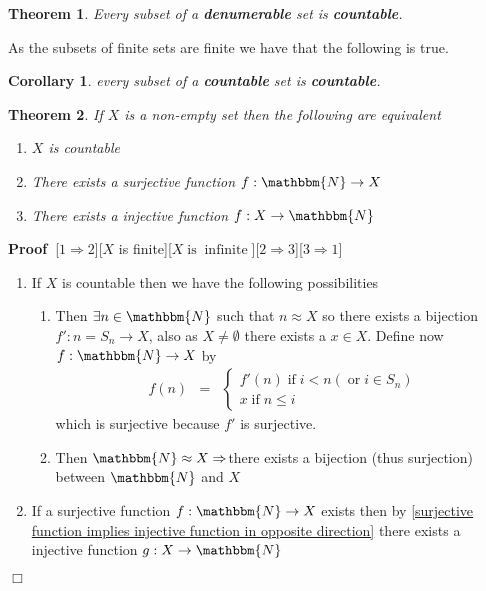 \documentclass{book}
\newcommand{\tmop}[1]{\ensuremath{\operatorname{#1}}}
\newcommand{\tmtextbf}[1]{{\bfseries{#1}}}
\newenvironment{proof}{\noindent\textbf{Proof\ }}{\hspace*{\fill}$\Box$\medskip}
\newtheorem{corollary}{Corollary}
\newtheorem{theorem}{Theorem}
\begin{document}
{{\begin{theorem}
  Every subset of a \tmtextbf{denumerable} set is \tmtextbf{countable}.
\end{theorem}

As the subsets of finite sets are finite we have that the following is true.

\begin{corollary}
  every subset of a \tmtextbf{countable} set is \tmtextbf{countable}.
\end{corollary}

\begin{theorem}
  \label{conditions for countability}If $X$ is a non-empty set then the
  following are equivalent
  \begin{enumerate}
    \item $X$ is countable
    
    \item There exists a surjective function $f : \mathbbm{N} \rightarrow X$
    
    \item There exists a injective function $f : X \rightarrow \mathbbm{N}$
  \end{enumerate}
\end{theorem}

\begin{proof}[$1 \Rightarrow 2$][$X$ is finite][$X \tmop{is}
\tmop{infinite}$][$2 \Rightarrow 3$][$3 \Rightarrow 1$]
  
  \begin{enumerate}
    \item If $X$ is countable then we have the following possibilities
    \begin{enumerate}
      \item Then $\exists n \in \mathbbm{N}$ such that $n \approx X$ so there
      exists a bijection $f' : n = S_n \rightarrow X$, also as $X \neq
      \emptyset$ there exists a $x \in X$. Define now $f : \mathbbm{N}
      \rightarrow X$ by
      \begin{eqnarray*}
        f (n) & = & \left\{ \begin{array}{l}
          f' (n) \tmop{if} i < n (\tmop{or} i \in S_n)\\
          x \tmop{if} n \leqslant i
        \end{array} \right.
      \end{eqnarray*}
      which is surjective because $f'$ is surjective.
      
      \item Then $\mathbbm{N} \approx X \Rightarrow$there exists a bijection
      (thus surjection) between $\mathbbm{N}$ and $X$
    \end{enumerate}
    \item If a surjective function $f : \mathbbm{N} \rightarrow X$ exists then
    by \ref{surjective function implies injective function in opposite
    direction} there exists a injective function $g : X \rightarrow
    \mathbbm{N}$
    

\end{enumerate}
\end{proof}}}
\end{document}
